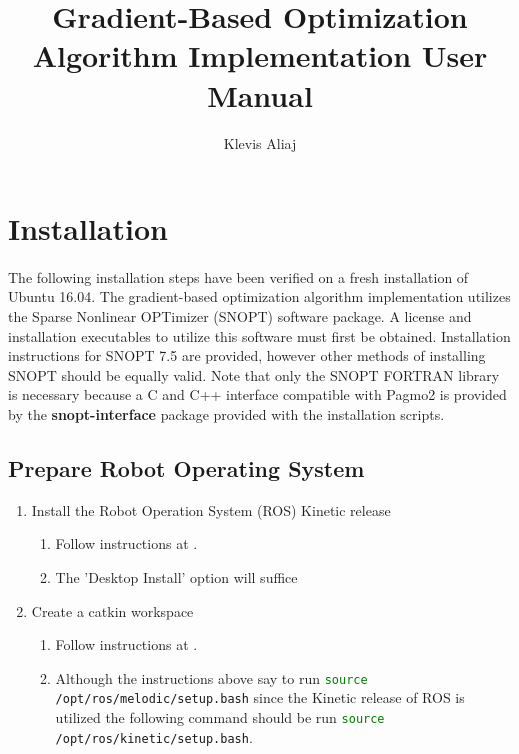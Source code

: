 \documentclass[letterpaper]{article}
\title{\textbf{Gradient-Based Optimization Algorithm Implementation User Manual}}
\author{Klevis Aliaj}
\date{} %
\begin{document}
\maketitle

\section{Installation} \label{sec:installation}
\paragraph{}
The following installation steps have been verified on a fresh installation of Ubuntu 16.04. The gradient-based optimization algorithm implementation utilizes the Sparse Nonlinear OPTimizer (SNOPT) software package. A license and installation executables to utilize this software must first be obtained. Installation instructions for SNOPT 7.5 are provided, however other methods of installing SNOPT should be equally valid. Note that only the SNOPT FORTRAN library is necessary because a C and C++ interface compatible with Pagmo2 is provided by the \textbf{snopt-interface} package provided with the installation scripts.

\subsection{Prepare Robot Operating System}
\begin{enumerate}
	\item Install the Robot Operation System (ROS) Kinetic release
		\begin{enumerate}
			\item Follow instructions at \href{http://wiki.ros.org/kinetic/Installation/Ubuntu}{}.
			\item The 'Desktop Install' option will suffice
		\end{enumerate}
	\item Create a catkin workspace
		\begin{enumerate}
			\item Follow instructions at \href{http://wiki.ros.org/catkin/Tutorials/create_a_workspace}{}.
			\item Although the instructions above say to run \lstinline[language=bash]!source /opt/ros/melodic/setup.bash! since the Kinetic release of ROS is utilized the following command should be run \lstinline[language=bash]!source /opt/ros/kinetic/setup.bash!.
		\end{enumerate}
\end{enumerate}
\end{document}
